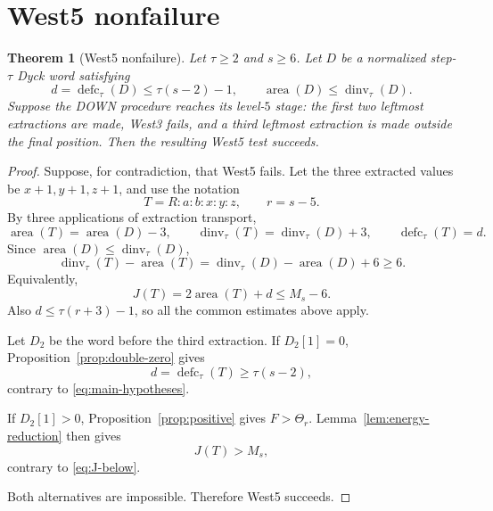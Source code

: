 \documentclass[11pt]{article}
\newtheorem{theorem}{Theorem}
\theoremstyle{definition}
\theoremstyle{remark}
\newcommand{\area}{\operatorname{area}}
\newcommand{\dinv}{\operatorname{dinv}}
\newcommand{\defc}{\operatorname{defc}}
\begin{document}
\section{West5 nonfailure}

\begin{theorem}[West5 nonfailure]
\label{thm:west5}
Let $\tau\ge2$ and $s\ge6$.  Let $D$ be a normalized step-$\tau$ Dyck
word satisfying
\begin{equation}
 d=\defc_\tau(D)\le\tau(s-2)-1,
 \qquad
 \area(D)\le\dinv_\tau(D).
 \label{eq:main-hypotheses}
\end{equation}
Suppose the DOWN procedure reaches its level-$5$ stage: the first two
leftmost extractions are made, West3 fails, and a third leftmost
extraction is made outside the final position.  Then the resulting
West5 test succeeds.
\end{theorem}

\begin{proof}
Suppose, for contradiction, that West5 fails.  Let the three extracted
values be $x+1,y+1,z+1$, and use the notation
\[
 T=R:a:b:x:y:z,
 \qquad
 r=s-5.
\]
By three applications of extraction transport,
\begin{equation}
 \area(T)=\area(D)-3,
 \qquad
 \dinv_\tau(T)=\dinv_\tau(D)+3,
 \qquad
 \defc_\tau(T)=d.
 \label{eq:three-transports}
\end{equation}
Since $\area(D)\le\dinv_\tau(D)$,
\[
 \dinv_\tau(T)-\area(T)
 =\dinv_\tau(D)-\area(D)+6\ge6.
\]
Equivalently,
\begin{equation}
 J(T)=2\area(T)+d\le M_s-6.
 \label{eq:J-below}
\end{equation}
Also $d\le\tau(r+3)-1$, so all the common estimates above apply.

Let $D_2$ be the word before the third extraction.  If $D_2[1]=0$,
Proposition~\ref{prop:double-zero} gives
\[
 d=\defc_\tau(T)\ge\tau(s-2),
\]
contrary to \eqref{eq:main-hypotheses}.

If $D_2[1]>0$, Proposition~\ref{prop:positive} gives
$F>\Theta_r$.  Lemma~\ref{lem:energy-reduction} then gives
\[
 J(T)>M_s,
\]
contrary to \eqref{eq:J-below}.

Both alternatives are impossible.  Therefore West5 succeeds.
\end{proof}
\end{document}
